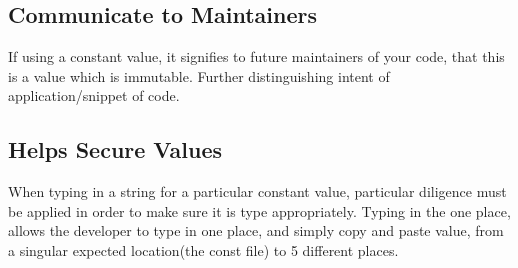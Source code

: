 \subsection { Communicate to Maintainers }
If using a constant value, it signifies to future maintainers of your code, that
this is a value which is immutable. Further distinguishing intent of
application/snippet of code.

\subsection { Helps Secure Values }
When typing in a string for a particular constant value, particular diligence
must be applied in order to make sure it is type appropriately. Typing in the
one place, allows the developer to type in one place, and simply copy and paste
value, from a singular expected location(the const file) to 5 different places.
